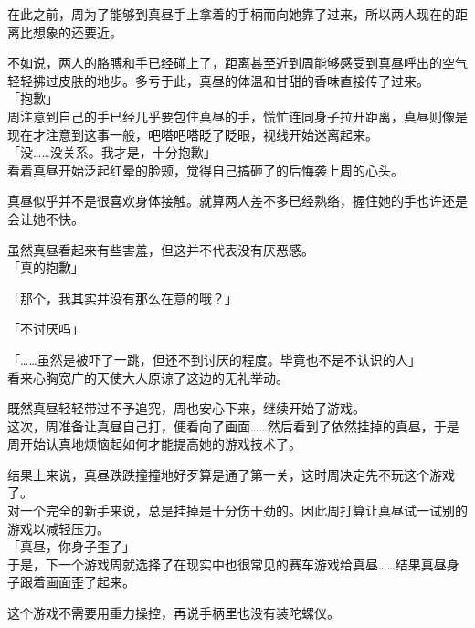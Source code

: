在此之前，周为了能够到真昼手上拿着的手柄而向她靠了过来，所以两人现在的距离比想象的还要近。

不如说，两人的胳膊和手已经碰上了，距离甚至近到周能够感受到真昼呼出的空气轻轻拂过皮肤的地步。多亏于此，真昼的体温和甘甜的香味直接传了过来。\\

「抱歉」\\

周注意到自己的手已经几乎要包住真昼的手，慌忙连同身子拉开距离，真昼则像是现在才注意到这事一般，吧嗒吧嗒眨了眨眼，视线开始迷离起来。\\

「没……没关系。我才是，十分抱歉」\\

看着真昼开始泛起红晕的脸颊，觉得自己搞砸了的后悔袭上周的心头。

真昼似乎并不是很喜欢身体接触。就算两人差不多已经熟络，握住她的手也许还是会让她不快。

虽然真昼看起来有些害羞，但这并不代表没有厌恶感。\\

「真的抱歉」

「那个，我其实并没有那么在意的哦？」

「不讨厌吗」

「……虽然是被吓了一跳，但还不到讨厌的程度。毕竟也不是不认识的人」\\

看来心胸宽广的天使大人原谅了这边的无礼举动。

既然真昼轻轻带过不予追究，周也安心下来，继续开始了游戏。\\

这次，周准备让真昼自己打，便看向了画面……然后看到了依然挂掉的真昼，于是周开始认真地烦恼起如何才能提高她的游戏技术了。\\

\vspace{2\baselineskip}

结果上来说，真昼跌跌撞撞地好歹算是通了第一关，这时周决定先不玩这个游戏了。\\

对一个完全的新手来说，总是挂掉是十分伤干劲的。因此周打算让真昼试一试别的游戏以减轻压力。\\

「真昼，你身子歪了」\\

于是，下一个游戏周就选择了在现实中也很常见的赛车游戏给真昼……结果真昼身子跟着画面歪了起来。

这个游戏不需要用重力操控，再说手柄里也没有装陀螺仪。\\

